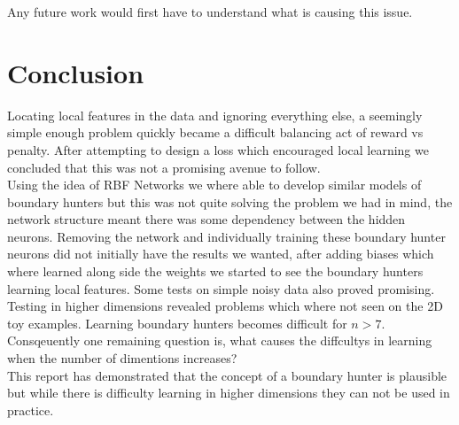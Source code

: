 \documentclass[notitlepage]{report}
\theoremstyle{definition}
\begin{document}
Any future work would first have to understand what is causing this issue. 

\chapter{Conclusion}
Locating local features in the data and ignoring everything else, a seemingly simple enough problem quickly became a difficult  balancing act of reward vs penalty. After attempting to design a loss which encouraged local learning we concluded that this was not a promising avenue to follow.\\

Using the idea of RBF Networks we where able to develop similar models of boundary hunters but this was not quite solving the problem we had in mind, the network structure meant there was some dependency between the hidden neurons. Removing the network and individually training these boundary hunter neurons did not initially have the results we wanted, after adding biases which where learned along side the weights we started to see the boundary hunters learning local features. Some tests on simple noisy data also proved promising.\\

Testing in higher dimensions revealed problems which where not seen on the 2D toy examples. Learning boundary hunters becomes difficult for $n > 7$. Consqeuently one remaining question is, what causes the diffcultys in learning when the number of dimentions increases?\\

This report has demonstrated that the concept of a boundary hunter is plausible but while there is difficulty learning in higher dimensions they can not be used in practice.


\newpage


\end{document}
